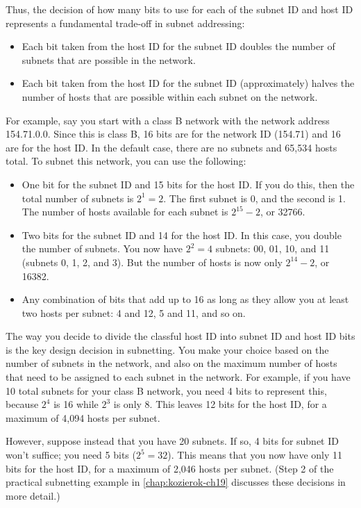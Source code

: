 Thus, the decision of how many bits to use for each of the subnet ID and
host ID represents a fundamental trade-off in subnet addressing:

\begin{itemize}
\item
   Each bit taken from the host ID for the subnet ID doubles the number of subnets that are possible in the network.
\item
   Each bit taken from the host ID for the subnet ID (approximately) halves the number of hosts that are possible within each subnet on the network.
\end{itemize}

For example, say you start with a class B network with the network
address 154.71.0.0. Since this is class B, 16 bits are for the network
ID (154.71) and 16 are for the host ID. In the default case, there are
no subnets and 65,534 hosts total. To subnet this network, you can use
the following:

\begin{itemize}
   \item
      One bit for the subnet ID and 15 bits for the host ID. If you do this,
      then the total number of subnets is $2^{1} = 2$.
      The first subnet is 0, and the second is 1.
      The number of hosts available  for each subnet is $2^{15}-2$, or 32766.
   \item
      Two bits for the subnet ID and 14 for the host ID.
      In this case, you double the number of subnets.
      You now have $2^{2}= 4$ subnets: 00, 01, 10, and 11 (subnets 0, 1, 2, and 3).
      But the number of hosts is now only $2^{14}-2$, or 16382.
   \item
      Any combination of bits that add up to 16 as long as they allow you at least two hosts per subnet: 4 and 12, 5 and 11, and so on.
\end{itemize}

The way you decide to divide the classful host ID into subnet ID and
host ID bits is the key design decision in subnetting. You make your
choice based on the number of subnets in the network, and also on the
maximum number of hosts that need to be assigned to each subnet in the
network. For example, if you have 10 total subnets for your class B
network, you need 4 bits to represent this, because $2^4$ is 16 while $2^3$ is only 8.
This leaves 12 bits for the host ID, for a maximum of 4,094 hosts per subnet.

However, suppose instead that you have 20 subnets. If so, 4 bits for
subnet ID won't suffice; you need 5 bits ($2^{5}=32$).
This means that you now have only 11 bits for the host ID, for a maximum of 2,046 hosts per subnet.
(Step 2 of the practical subnetting example in \vref{chap:kozierok-ch19} discusses these decisions in more detail.)

